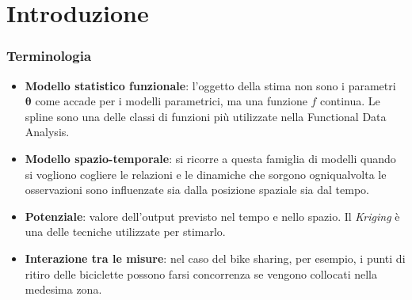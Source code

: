 \section{Introduzione}

\begin{frame}
	\frametitle{Terminologia}
	\centering
	
	\begin{itemize}
		\justifying
		\item \textbf{Modello statistico funzionale}: l'oggetto della stima non sono i parametri $\boldsymbol{\theta}$ come accade per i modelli parametrici, ma una funzione $f$ continua. Le spline sono una delle classi di funzioni più utilizzate nella Functional Data Analysis.
		\item \textbf{Modello spazio-temporale}: si ricorre a questa famiglia di modelli quando si vogliono cogliere le relazioni e le dinamiche che sorgono ogniqualvolta le osservazioni sono influenzate sia dalla posizione spaziale sia dal tempo.
		\item \textbf{Potenziale}: valore dell'output previsto nel tempo e nello spazio. Il \textit{Kriging} è una delle tecniche utilizzate per stimarlo. 
		\item \textbf{Interazione tra le misure}: nel caso del bike sharing, per esempio, i punti di ritiro delle biciclette possono farsi concorrenza se vengono collocati nella medesima zona.
	\end{itemize}
	
\end{frame}

